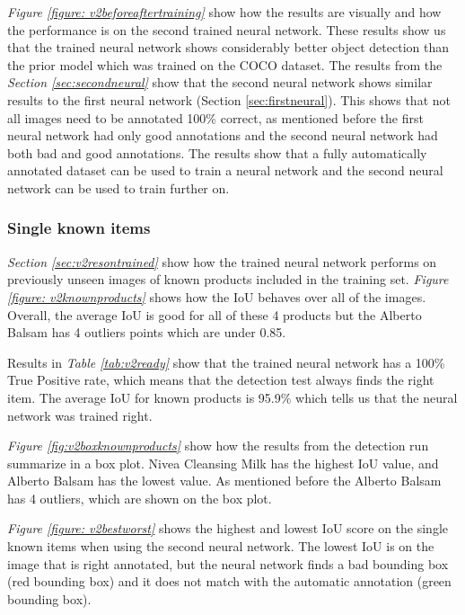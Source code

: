 \textit{Figure \ref{figure: v2beforeaftertraining}} show how the results are visually and how the performance is on the second trained neural network. These results show us that the trained neural network shows considerably better object detection than the prior model which was trained on the COCO dataset. The results from the \textit{Section \ref{sec:secondneural}} show that the second neural network shows similar results to the first neural network ({Section \ref{sec:firstneural}}). This shows that not all images need to be annotated 100\% correct, as mentioned before the first neural network had only good annotations and the second neural network had both bad and good annotations. The results show that a fully automatically annotated dataset can be used to train a neural network and the second neural network can be used to train further on.


\subsubsection{Single known items}
\textit{Section \ref{sec:v2resontrained}} show how the trained neural network performs on previously unseen images of known products included in the training set. \textit{Figure \ref{figure: v2knownproducts}} shows how the IoU behaves over all of the images. Overall, the average IoU is good for all of these 4 products but the Alberto Balsam has 4 outliers points which are under 0.85.%

Results in \textit{Table \ref{tab:v2ready}} show that the trained neural network has a 100\% True Positive rate, which means that the detection test always finds the right item. The average IoU for known products is 95.9\% which tells us that the neural network was trained right.

\textit{Figure \ref{fig:v2boxknownproducts}} show how the results from the detection run summarize in a box plot. Nivea Cleansing Milk has the highest IoU value, and Alberto Balsam has the lowest value. As mentioned before the Alberto Balsam has 4 outliers, which are shown on the box plot.

\textit{Figure \ref{figure: v2bestworst}} shows the highest and lowest IoU score on the single known items when using the second neural network. The lowest IoU is on the image that is right annotated, but the neural network finds a bad bounding box (red bounding box) and it does not match with the automatic annotation (green bounding box).


